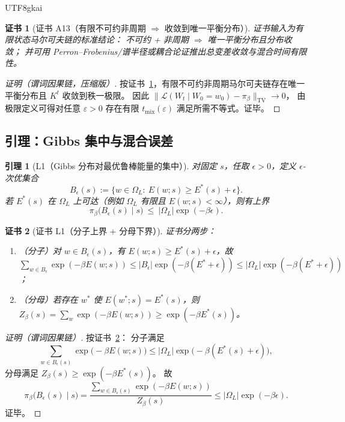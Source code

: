 \documentclass[12pt]{article}
\newtheorem{lemma}{引理}[section]
\newtheorem{Certificate}{证书}[section]
\begin{document}
\begin{CJK*}{UTF8}{gkai}
\begin{Certificate}[证书 A13（有限不可约非周期 $\Rightarrow$ 收敛到唯一平衡分布）]
\label{cert:tex27-ch11-a13}
证书输入为有限状态马尔可夫链的标准结论：
不可约 + 非周期 $\Rightarrow$ 唯一平衡分布且分布收敛；
并可用 Perron--Frobenius/谱半径或耦合论证推出总变差收敛与混合时间有限性。
\end{Certificate}

\begin{proof}[证明（谓词因果链，压缩版）]
按证书~\ref{cert:tex27-ch11-a13}，有限不可约非周期马尔可夫链存在唯一平衡分布且 $K^t$ 收敛到秩一极限。
因此 $\|\mathcal{L}(W_t\mid W_0=w_0)-\pi_\beta\|_{\mathrm{TV}}\to 0$，
由极限定义可得对任意 $\varepsilon>0$ 存在有限 $t_{\mathrm{mix}}(\varepsilon)$ 满足所需不等式。证毕。
\end{proof}

\subsection{引理：Gibbs 集中与混合误差}
\label{subsec:tex27-ch11-lemmas}

\begin{lemma}[L1（Gibbs 分布对最优鲁棒能量的集中）]
\label{lem:tex27-ch11-l1}
对固定 $s$，任取 $\epsilon>0$，定义 $\epsilon$-次优集合
\[
  B_\epsilon(s):=\{w\in\Omega_L:\ E(w;s)\ge E^\ast(s)+\epsilon\}.
\]
若 $E^\ast(s)$ 在 $\Omega_L$ 上可达（例如 $\Omega_L$ 有限且 $E(w;s)<\infty$），则有上界
\[
  \pi_\beta\bigl(B_\epsilon(s)\mid s\bigr)\ \le\ |\Omega_L|\exp(-\beta\epsilon).
\]
\end{lemma}

\begin{Certificate}[证书 L1（分子上界 + 分母下界）]
\label{cert:tex27-ch11-l1}
证书分两步：
\begin{enumerate}
  \item（分子）对 $w\in B_\epsilon(s)$，有 $E(w;s)\ge E^\ast(s)+\epsilon$，故
  $\sum_{w\in B_\epsilon}\exp(-\beta E(w;s))\le |B_\epsilon|\exp(-\beta(E^\ast+\epsilon))
    \le|\Omega_L|\exp(-\beta(E^\ast+\epsilon))$；
  \item（分母）若存在 $w^\ast$ 使 $E(w^\ast;s)=E^\ast(s)$，则
  $Z_\beta(s)=\sum_{w}\exp(-\beta E(w;s))\ge \exp(-\beta E^\ast(s))$。
\end{enumerate}
\end{Certificate}

\begin{proof}[证明（谓词因果链）]
按证书~\ref{cert:tex27-ch11-l1}：
分子满足
\[
  \sum_{w\in B_\epsilon(s)}\exp\bigl(-\beta E(w;s)\bigr)
  \le |\Omega_L|\exp\bigl(-\beta(E^\ast(s)+\epsilon)\bigr),
\]
分母满足 $Z_\beta(s)\ge \exp(-\beta E^\ast(s))$。
故
\[
  \pi_\beta\bigl(B_\epsilon(s)\mid s\bigr)
  =\frac{\sum_{w\in B_\epsilon(s)}\exp(-\beta E(w;s))}{Z_\beta(s)}
  \le |\Omega_L|\exp(-\beta\epsilon).
\]
证毕。
\end{proof}


\end{CJK*}
\end{document}
